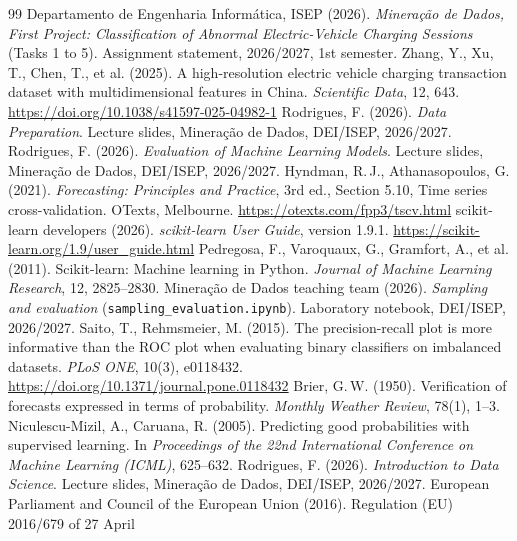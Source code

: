 \documentclass[12pt,a4paper,openany]{report}
\begin{document}
\clearpage
{}
{}
\begin{thebibliography}{99}
 Departamento de Engenharia Informática, ISEP (2026). \emph{Mineração de Dados, First Project:
  Classification of Abnormal Electric-Vehicle Charging Sessions} (Tasks 1 to 5). Assignment statement, 2026/2027,
  1st semester.
 Zhang, Y., Xu, T., Chen, T., et al. (2025). A high-resolution electric vehicle
  charging transaction dataset with multidimensional features in China. \emph{Scientific Data}, 12, 643.
  \url{https://doi.org/10.1038/s41597-025-04982-1}
 Rodrigues, F. (2026). \emph{Data Preparation}. Lecture slides, Mineração de Dados, DEI/ISEP,
  2026/2027.
 Rodrigues, F. (2026). \emph{Evaluation of Machine Learning Models}. Lecture slides, Mineração
  de Dados, DEI/ISEP, 2026/2027.
 Hyndman, R.\,J., Athanasopoulos, G. (2021). \emph{Forecasting: Principles and Practice}, 3rd ed.,
  Section 5.10, Time series cross-validation. OTexts, Melbourne. \url{https://otexts.com/fpp3/tscv.html}
 scikit-learn developers (2026). \emph{scikit-learn User Guide}, version 1.9.1.
  \url{https://scikit-learn.org/1.9/user_guide.html}
 Pedregosa, F., Varoquaux, G., Gramfort, A., et al. (2011). Scikit-learn: Machine learning
  in Python. \emph{Journal of Machine Learning Research}, 12, 2825--2830.
 Mineração de Dados teaching team (2026). \emph{Sampling and evaluation}
  (\texttt{sampling\_evaluation.ipynb}). Laboratory notebook, DEI/ISEP, 2026/2027.
 Saito, T., Rehmsmeier, M. (2015). The precision-recall plot is more informative than the ROC
  plot when evaluating binary classifiers on imbalanced datasets. \emph{PLoS ONE}, 10(3), e0118432.
  \url{https://doi.org/10.1371/journal.pone.0118432}
 Brier, G.\,W. (1950). Verification of forecasts expressed in terms of probability.
  \emph{Monthly Weather Review}, 78(1), 1--3.
 Niculescu-Mizil, A., Caruana, R. (2005). Predicting good probabilities with supervised learning.
  In \emph{Proceedings of the 22nd International Conference on Machine Learning (ICML)}, 625--632.
 Rodrigues, F. (2026). \emph{Introduction to Data Science}. Lecture slides, Mineração de Dados,
  DEI/ISEP, 2026/2027.
 European Parliament and Council of the European Union (2016). Regulation (EU) 2016/679 of 27 April

\end{thebibliography}
\end{document}
